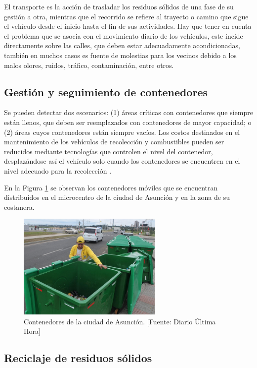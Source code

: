 El transporte es la acción de trasladar los residuos sólidos de una fase de su gestión a otra, mientras que el recorrido se refiere al trayecto o camino que sigue el vehículo desde el inicio hasta el fin de sus actividades. Hay que tener en cuenta el problema que se asocia con el movimiento diario de los vehículos, este incide directamente sobre las calles, que deben estar adecuadamente acondicionadas, también en muchos casos es fuente de molestias para los vecinos debido a los malos olores, ruidos, tráfico, contaminación, entre otros.

\subsection{Gestión y seguimiento de contenedores}

Se pueden detectar dos escenarios: (1) áreas críticas con contenedores que siempre están llenos, que deben ser reemplazados con contenedores de mayor capacidad; o (2) áreas cuyos contenedores están siempre vacíos. Los costos destinados en el mantenimiento de los vehículos de recolección y combustibles pueden ser reducidos mediante tecnologías que controlen el nivel del contenedor, desplazándose así el vehículo solo cuando los contenedores se encuentren en el nivel adecuado para la recolección \citep{VitorinodeSouzaMelare2017TechnologiesReview}.

En la Figura \ref{fig:contenedoresMDA} se observan los contenedores móviles que se encuentran distribuidos en el microcentro de la ciudad de Asunción y en la zona de su costanera.

\begin{figure}[H]
    \centering
    \includegraphics[width=7cm]{contenedores_mda.png}
    \caption{Contenedores de la ciudad de Asunción. [Fuente: Diario Última Hora]}
    \label{fig:contenedoresMDA}
\end{figure}

\subsection{Reciclaje de residuos sólidos}

